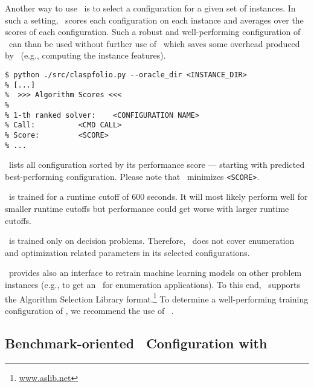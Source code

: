 \begin{example}\label{subsec:example:claspfolio_oracle}
Another way to use \claspfolio\ is to select a configuration for a given set of instances.
In such a setting, \claspfolio\ scores each configuration on each instance 
and averages over the scores of each configuration.
Such a robust and well-performing configuration of \clasp\ can than be used without further use of \claspfolio\
which saves some overhead produced by \claspfolio\ (e.g., computing the instance features).

\begin{lstlisting}[numbers=none]
$ python ./src/claspfolio.py --oracle_dir <INSTANCE_DIR>
% [...]
%  >>> Algorithm Scores <<<
% 
% 1-th ranked solver: 	 <CONFIGURATION NAME>
% Call: 		 <CMD CALL>
% Score: 		 <SCORE>
% ...
\end{lstlisting}
%
\claspfolio\ lists all configuration sorted by its performance score --- starting with predicted best-performing configuration.
Please note that \claspfolio\ minimizes \texttt{<SCORE>}.
\end{example}

\begin{note}
\claspfolio\ is trained for a runtime cutoff of $600$ seconds. 
It will most likely perform well for smaller runtime cutoffs 
but performance could get worse with larger runtime cutoffs.
\end{note}

\begin{note}
\claspfolio\ is trained only on decision problems.
Therefore, \claspfolio\ does not cover enumeration and optimization related parameters in its selected configurations.
\end{note}

\claspfolio\ provides also an interface to retrain machine learning models on other problem instances 
(e.g., to get an \claspfolio\ for enumeration applications).
To this end, \claspfolio\ supports the Algorithm Selection Library format.\footnote{\url{www.aslib.net}}
To determine a well-performing training configuration of \claspfolio,
we recommend the use of \sysfont{autofolio}~\cite{lihohusc15a}.%

\subsection{Benchmark-oriented \clasp\ Configuration with \piclasp}
\label{sec:piclasp}

